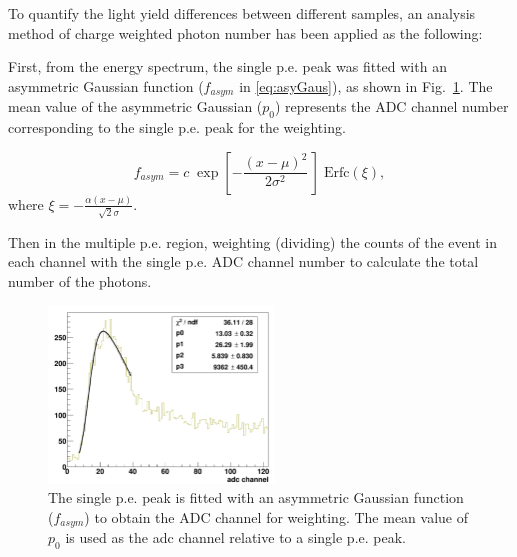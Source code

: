 
To quantify the light yield differences between different samples, an analysis method of charge weighted photon number has been applied as the following:

First, from the energy spectrum, the single p.e. peak was fitted with an asymmetric Gaussian function ($f_{asym}$ in \ref{eq:asyGaus}), as shown in Fig.~\ref{fitSinglePE}. The mean value of the asymmetric Gaussian ($p_0$) represents the ADC channel number corresponding to the single p.e. peak for the weighting. 

\begin{equation}\label{eq:asyGaus}
f_{asym}=c \; \exp\left[- \frac{(x-\mu)^2}{2 \sigma^2} \, \right] \; \mathrm{Erfc}(\xi),
\end{equation}
where $\xi=-\frac{\alpha(x-\mu)}{\sqrt 2\sigma}$.

Then in the multiple p.e. region, weighting (dividing) the counts of the event in each channel with the single p.e. ADC channel number to calculate the total number of the photons.

\begin{figure}[htbp]
	\centering	
	\includegraphics[width=6cm]{fitSinglePE.png}
	\caption[The single p.e. peak fitted with an asymmetric Gaussian function.]{The single p.e. peak is fitted with an asymmetric Gaussian function ($f_{asym}$) to obtain the ADC channel for weighting. The mean value of $p_0$ is used as the adc channel relative to a single p.e. peak.}
	\label{fitSinglePE}
\end{figure}

